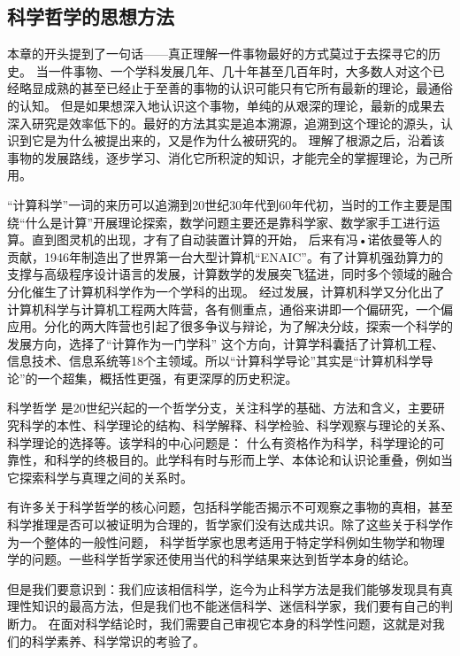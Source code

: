 \documentclass{article}
\begin{document}
\subsection{科学哲学的思想方法}
本章的开头提到了一句话——真正理解一件事物最好的方式莫过于去探寻它的历史。
当一件事物、一个学科发展几年、几十年甚至几百年时，大多数人对这个已经略显成熟的甚至已经止于至善的事物的认识可能只有它所有最新的理论，最通俗的认知。
但是如果想深入地认识这个事物，单纯的从艰深的理论，最新的成果去深入研究是效率低下的。最好的方法其实是追本溯源，追溯到这个理论的源头，认识到它是为什么被提出来的，又是作为什么被研究的。
理解了根源之后，沿着该事物的发展路线，逐步学习、消化它所积淀的知识，才能完全的掌握理论，为己所用。\par
“计算科学”一词的来历可以追溯到20世纪30年代到60年代初，当时的工作主要是围绕“什么是计算”开展理论探索，数学问题主要还是靠科学家、数学家手工进行运算。直到图灵机的出现，才有了自动装置计算的开始，
后来有冯•诺依曼等人的贡献，1946年制造出了世界第一台大型计算机“ENAIC”。有了计算机强劲算力的支撑与高级程序设计语言的发展，计算数学的发展突飞猛进，同时多个领域的融合分化催生了计算机科学作为一个学科的出现。
经过发展，计算机科学又分化出了计算机科学与计算机工程两大阵营，各有侧重点，通俗来讲即一个偏研究，一个偏应用。分化的两大阵营也引起了很多争议与辩论，为了解决分歧，探索一个科学的发展方向，选择了“计算作为一门学科”
这个方向，计算学科囊括了计算机工程、信息技术、信息系统等18个主领域。所以“计算科学导论”其实是“计算机科学导论”的一个超集，概括性更强，有更深厚的历史积淀。\par
科学哲学 \citep{curd1998philosophy} 是20世纪兴起的一个哲学分支，关注科学的基础、方法和含义，主要研究科学的本性、科学理论的结构、科学解释、科学检验、科学观察与理论的关系、科学理论的选择等。该学科的中心问题是：
什么有资格作为科学，科学理论的可靠性，和科学的终极目的。此学科有时与形而上学、本体论和认识论重叠，例如当它探索科学与真理之间的关系时。\par
有许多关于科学哲学的核心问题，包括科学能否揭示不可观察之事物的真相，甚至科学推理是否可以被证明为合理的，哲学家们没有达成共识。除了这些关于科学作为一个整体的一般性问题，
科学哲学家也思考适用于特定学科例如生物学和物理学的问题。一些科学哲学家还使用当代的科学结果来达到哲学本身的结论。\par
但是我们要意识到：我们应该相信科学，迄今为止科学方法是我们能够发现具有真理性知识的最高方法，但是我们也不能迷信科学、迷信科学家，我们要有自己的判断力。
在面对科学结论时，我们需要自己审视它本身的科学性问题，这就是对我们的科学素养、科学常识的考验了。
\end{document}
